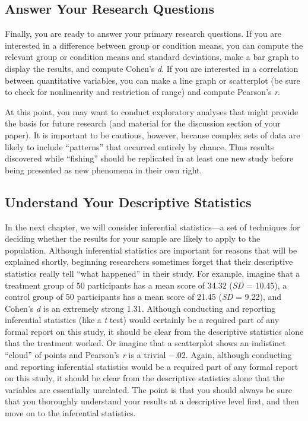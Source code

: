 \documentclass[
]{krantz}
\begin{document}
\subsection*{Answer Your Research Questions}\label{answer-your-research-questions}


Finally, you are ready to answer your primary research questions. If you are interested in a difference between group or condition means, you can compute the relevant group or condition means and standard deviations, make a bar graph to display the results, and compute Cohen's \emph{d}. If you are interested in a correlation between quantitative variables, you can make a line graph or scatterplot (be sure to check for nonlinearity and restriction of range) and compute Pearson's \emph{r}.

At this point, you may want to conduct exploratory analyses that might provide the basis for future research (and material for the discussion section of your paper). It is important to be cautious, however, because complex sets of data are likely to include ``patterns'' that occurred entirely by chance. Thus results discovered while ``fishing'' should be replicated in at least one new study before being presented as new phenomena in their own right.

\subsection*{Understand Your Descriptive Statistics}\label{understand-your-descriptive-statistics}


In the next chapter, we will consider inferential statistics---a set of techniques for deciding whether the results for your sample are likely to apply to the population. Although inferential statistics are important for reasons that will be explained shortly, beginning researchers sometimes forget that their descriptive statistics really tell ``what happened'' in their study. For example, imagine that a treatment group of 50 participants has a mean score of 34.32 (\emph{SD} = 10.45), a control group of 50 participants has a mean score of 21.45 (\emph{SD} = 9.22), and Cohen's \emph{d} is an extremely strong 1.31. Although conducting and reporting inferential statistics (like a \emph{t} test) would certainly be a required part of any formal report on this study, it should be clear from the descriptive statistics alone that the treatment worked. Or imagine that a scatterplot shows an indistinct ``cloud'' of points and Pearson's \emph{r} is a trivial −.02. Again, although conducting and reporting inferential statistics would be a required part of any formal report on this study, it should be clear from the descriptive statistics alone that the variables are essentially unrelated. The point is that you should always be sure that you thoroughly understand your results at a descriptive level first, and then move on to the inferential statistics.
\end{document}
